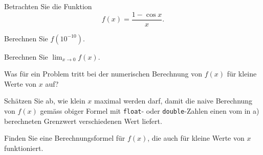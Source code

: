 Betrachten Sie die Funktion
\[
f(x) = \frac{1-\cos x}{x}.
\]
\begin{teilaufgaben}
\item Berechnen Sie $f(10^{-10})$.
\item Berechnen Sie $\displaystyle \lim_{x\to 0} f(x)$.
\item Was für ein Problem tritt bei der numerischen Berechnung von
$f(x)$ für kleine Werte von $x$ auf?
\item Schätzen Sie ab, wie klein  $x$ maximal werden darf, damit
die naive Berechnung von $f(x)$ gemäss obiger Formel mit
\texttt{float}- oder \texttt{double}-Zahlen einen vom in a) berechneten
Grenzwert verschiedenen Wert liefert.
\item Finden Sie eine Berechnungsformel für $f(x)$, die auch für kleine
Werte von $x$ funktioniert.
\end{teilaufgaben}


